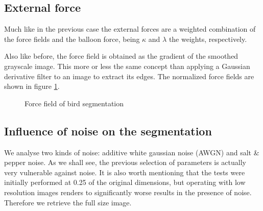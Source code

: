 \subsection{External force}

Much like in the previous case the external forces are a weighted combination of the force fields and the balloon force, being $\kappa$ and $\lambda$ the weights, respectively.

Also like before, the force field is obtained as the gradient of the smoothed grayscale image. This more or less the same concept than applying a Gaussian derivative filter to an image to extract its edges. The normalized force fields are shown in figure \ref{fig:bird-ff}.

\begin{figure}[!hbt]
\centering   
{}
\caption{Force field of bird segmentation}
\label{fig:bird-ff}
\end{figure}

\subsection{Influence of noise on the segmentation}

We analyse two kinds of noise: additive white gaussian noise (AWGN) and salt \& pepper noise. As we shall see, the previous selection of parameters is actually very vulnerable against noise. It is also worth mentioning that the tests were initially performed at 0.25 of the original dimensions, but operating with low resolution images renders to significantly worse results in the presence of noise. Therefore we retrieve the full size image.

